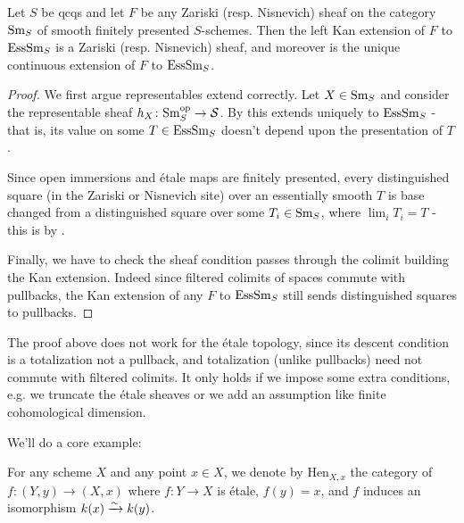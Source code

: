\documentclass[11pt,openany]{book}
\providecommand{\Hen}{\mathrm{Hen}}
\begin{document}
\begin{theorem}\label{thm:zar-nis-topoi-are-continuous} Let $S$ be qcqs and let $F$ be any Zariski (resp. Nisnevich) sheaf on the category $\mathrm{Sm}_S$ of smooth finitely presented $S$-schemes. Then the left Kan extension of $F$ to $\mathrm{EssSm}_S$ is a Zariski (resp. Nisnevich) sheaf, and moreover is the unique continuous extension of $F$ to $\mathrm{EssSm}_S$.
\end{theorem}
\begin{proof} We first argue representables extend correctly. Let $X\in \mathrm{Sm}_S$ and consider the representable sheaf $h_X \colon \mathrm{Sm}_S^{\mathrm{op}} \to \mathcal{S}$. By  this extends uniquely to $\mathrm{EssSm}_S$ - that is, its value on some $T\in \mathrm{EssSm}_S$ doesn't depend upon the presentation of $T$.

Since open immersions and \'etale maps are finitely presented, every distinguished square (in the Zariski or Nisnevich site) over an essentially smooth $T$ is base changed from a distinguished square over some $T_i \in \mathrm{Sm}_S$, where $\lim_i T_i = T$ - this is by \cite[01ZM,07RP]{Stacks}.

Finally, we have to check the sheaf condition passes through the colimit building the Kan extension. Indeed since filtered colimits of spaces commute with pullbacks, the Kan extension of any $F$ to $\mathrm{EssSm}_S$ still sends distinguished squares to pullbacks.
\end{proof}

\begin{remark} The proof above does not work for the \'etale topology, since its descent condition is a totalization not a pullback, and totalization (unlike pullbacks) need not commute with filtered colimits. It only holds if we impose some extra conditions, e.g. we truncate the \'etale sheaves or we add an assumption like finite cohomological dimension.
\end{remark}

We'll do a core example:

\begin{notation}\label{nota:HenXx} 
For any scheme $X$ and any point $x\in X$, we denote by $\Hen_{X,x}$ the category of $f \colon (Y,y) \to (X,x)$ where $f \colon Y \to X$ is \'etale, $f(y) = x$, and $f$ induces an isomorphism $k(x) \xrightarrow{\sim} k(y)$.
\end{notation}
\end{document}
